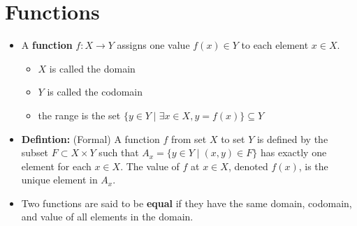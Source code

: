 \documentclass[11pt,twoside]{report}
\begin{document}
\section{Functions} 


\begin{itemize}
\item A \textbf{function} $f \colon X \to Y$   assigns  one value $f(x) \in Y$ to each element $x\in X$. 
\begin{itemize}
\item $X$ is called the domain
\item  $Y$ is called the codomain 
\item the range is the set  $\{ y \in Y \mid \exists x \in X , y = f(x) \} \subseteq Y$
\end{itemize}
\item \textbf{Defintion:} (Formal)  A function $f$ from set $X$ to set $Y$ is defined by the subset $F \subset X \times Y$ such that $A_x = \{ y\in Y \mid (x,y) \in F\}$ has exactly one element for each $x \in X$. The value of $f$ at $x \in X$, denoted $f(x)$, is the unique element in $A_x$. 


\item Two functions are said to be \textbf{equal} if they have the same domain, codomain, and value of all elements in the domain. 




\end{itemize}
\end{document}
